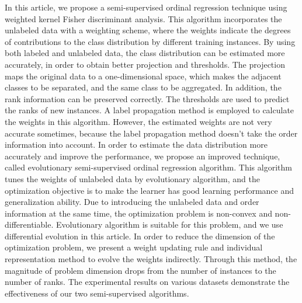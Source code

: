 \begin{enabstract}
In this article, we propose a semi-supervised ordinal regression technique using weighted kernel Fisher discriminant analysis. This algorithm incorporates the unlabeled data with a weighting scheme, where the weights indicate the degrees of contributions to the class distribution by different training instances. By using both labeled and unlabeled data, the class distribution can be estimated more accurately, in order to obtain better projection and thresholds. The projection maps the original data to a one-dimensional space, which makes the adjacent classes to be separated, and the same class to be aggregated. In addition, the rank information can be preserved correctly. The thresholds are used to predict the ranks of new instances. A label propagation method is employed to calculate the weights in this algorithm. However, the estimated weights are not very accurate sometimes, because the label propagation method doesn't take the order information into account. In order to estimate the data distribution more accurately and improve the performance, we propose an improved technique, called evolutionary semi-supervised ordinal regression algorithm. This algorithm tunes the weights of unlabeled data by evolutionary algorithm, and the optimization objective is to make the learner has good learning performance and generalization ability. Due to introducing the unlabeled data and order information at the same time, the optimization problem is non-convex and non-differentiable. Evolutionary algorithm is suitable for this problem, and we use differential evolution in this article. In order to reduce the dimension of the optimization problem, we present a weight updating rule and individual representation method to evolve the weights indirectly. Through this method, the magnitude of problem dimension drops from the number of instances to the number of ranks. The experimental results on various datasets demonstrate the effectiveness of our two semi-supervised algorithms. 


\end{enabstract}
